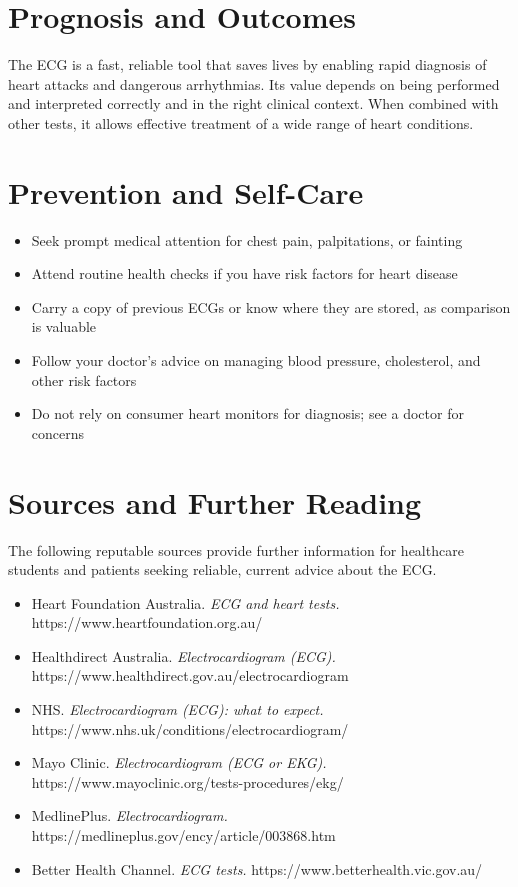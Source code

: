 \section*{Prognosis and Outcomes}
The ECG is a fast, reliable tool that saves lives by enabling rapid diagnosis of heart attacks and dangerous arrhythmias. Its value depends on being performed and interpreted correctly and in the right clinical context. When combined with other tests, it allows effective treatment of a wide range of heart conditions.

\section*{Prevention and Self-Care}
\begin{itemize}
    \item Seek prompt medical attention for chest pain, palpitations, or fainting
    \item Attend routine health checks if you have risk factors for heart disease
    \item Carry a copy of previous ECGs or know where they are stored, as comparison is valuable
    \item Follow your doctor's advice on managing blood pressure, cholesterol, and other risk factors
    \item Do not rely on consumer heart monitors for diagnosis; see a doctor for concerns
\end{itemize}

\section*{Sources and Further Reading}
The following reputable sources provide further information for healthcare students and patients seeking reliable, current advice about the ECG.
\begin{itemize}
    \item Heart Foundation Australia. \textit{ECG and heart tests.} https://www.heartfoundation.org.au/
    \item Healthdirect Australia. \textit{Electrocardiogram (ECG).} https://www.healthdirect.gov.au/electrocardiogram
    \item NHS. \textit{Electrocardiogram (ECG): what to expect.} https://www.nhs.uk/conditions/electrocardiogram/
    \item Mayo Clinic. \textit{Electrocardiogram (ECG or EKG).} https://www.mayoclinic.org/tests-procedures/ekg/
    \item MedlinePlus. \textit{Electrocardiogram.} https://medlineplus.gov/ency/article/003868.htm
    \item Better Health Channel. \textit{ECG tests.} https://www.betterhealth.vic.gov.au/
\end{itemize}
